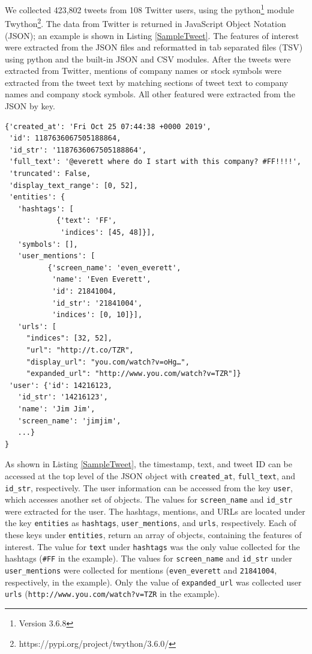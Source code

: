 \documentclass[journal]{IEEEtran}
\begin{document}
We collected 423,802 tweets from 108 Twitter users, using the
 python\footnote{Version 3.6.8}
 module Twython\footnote{https://pypi.org/project/twython/3.6.0/}.
The data from Twitter is returned in JavaScript Object Notation (JSON); 
 an example is shown in Listing \ref{SampleTweet}.
The features of interest were extracted from the JSON files and reformatted in tab
 separated files (TSV) using python and the built-in JSON and CSV modules.
After the tweets were extracted from Twitter,
 mentions of company names or stock symbols were extracted from the tweet text by
 matching sections of tweet text to company names and company stock symbols.
All other featured were extracted from the JSON by key.


\begin{lstlisting}[frame=single,
 caption={Sample Tweet JSON},
 label={SampleTweet}]
{'created_at': 'Fri Oct 25 07:44:38 +0000 2019',
 'id': 1187636067505188864,
 'id_str': '1187636067505188864',
 'full_text': '@everett where do I start with this company? #FF!!!!',
 'truncated': False,
 'display_text_range': [0, 52],
 'entities': {
   'hashtags': [
            {'text': 'FF',
             'indices': [45, 48]}],
   'symbols': [],
   'user_mentions': [
          {'screen_name': 'even_everett',
           'name': 'Even Everett',
           'id': 21841004,
           'id_str': '21841004',
           'indices': [0, 10]}],
   'urls': [
     "indices": [32, 52],
     "url": "http://t.co/TZR",
     "display_url": "you.com/watch?v=oHg…",
     "expanded_url": "http://www.you.com/watch?v=TZR"]}
 'user': {'id': 14216123,
   'id_str': '14216123',
   'name': 'Jim Jim',
   'screen_name': 'jimjim',
   ...}
}
\end{lstlisting}

As shown in Listing \ref{SampleTweet}, the timestamp, text, and tweet ID
 can be accessed at the top level of the JSON object with \texttt{created\_at},
 \texttt{full\_text}, and \texttt{id\_str}, respectively. 
The user information can be accessed from the key \texttt{user}, 
 which accesses another set of objects. 
The values for \texttt{screen\_name} and \texttt{id\_str} were extracted for the user.
The hashtags, mentions, and URLs are located under the key \texttt{entities} as
 \texttt{hashtags}, \texttt{user\_mentions}, and \texttt{urls}, respectively.
Each of these keys under \texttt{entities}, return an array of objects,
 containing the features of interest. 
The value for \texttt{text} under \texttt{hashtags} was the only value collected
 for the hashtags (\texttt{\#FF} in the example).
The values for \texttt{screen\_name} and \texttt{id\_str} under 
 \texttt{user\_mentions} were collected for mentions (\texttt{even\_everett} and
 \texttt{21841004}, respectively, in the example).
Only the value of \texttt{expanded\_url} was collected user \texttt{urls}
 (\texttt{http://www.you.com/watch?v=TZR} in the example).
\end{document}
